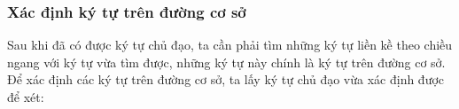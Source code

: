 \documentclass[a4paper]{article}
\theoremstyle{definition}
\begin{document}
	
	
	
	
	\subsubsection*{Xác định ký tự trên đường cơ sở}
	
	Sau khi đã có được ký tự chủ đạo\cite{zanibbi}, ta cần phải tìm những ký tự liền kề theo chiều ngang với ký tự vừa tìm được, những ký tự này chính là ký tự trên đường cơ sở. Để xác định các ký tự trên đường cơ sở, ta lấy ký tự chủ đạo\cite{zanibbi} vừa xác định được để xét:
	
\end{document}
